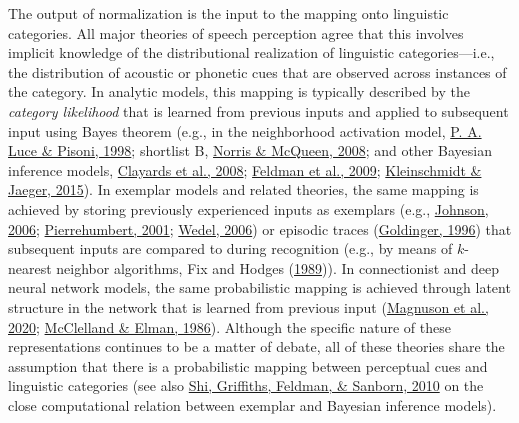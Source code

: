 \documentclass[
  11pt,
  man,floatsintext]{apa6}
\begin{document}
The output of normalization is the input to the mapping onto linguistic categories. All major theories of speech perception agree that this involves implicit knowledge of the distributional realization of linguistic categories---i.e., the distribution of acoustic or phonetic cues that are observed across instances of the category. In analytic models, this mapping is typically described by the \emph{category likelihood} that is learned from previous inputs and applied to subsequent input using Bayes theorem (e.g., in the neighborhood activation model, \protect\hyperlink{ref-luce-pisoni1998}{P. A. Luce \& Pisoni, 1998}; shortlist B, \protect\hyperlink{ref-norris-mcqueen2008}{Norris \& McQueen, 2008}; and other Bayesian inference models, \protect\hyperlink{ref-clayards2008}{Clayards et al., 2008}; \protect\hyperlink{ref-feldman2009}{Feldman et al., 2009}; \protect\hyperlink{ref-kleinschmidt-jaeger2015}{Kleinschmidt \& Jaeger, 2015}). In exemplar models and related theories, the same mapping is achieved by storing previously experienced inputs as exemplars (e.g., \protect\hyperlink{ref-johnson2006}{Johnson, 2006}; \protect\hyperlink{ref-pierrehumbert2001}{Pierrehumbert, 2001}; \protect\hyperlink{ref-wedel2006}{Wedel, 2006}) or episodic traces (\protect\hyperlink{ref-goldinger1996}{Goldinger, 1996}) that subsequent inputs are compared to during recognition (e.g., by means of \(k\)-nearest neighbor algorithms, Fix and Hodges (\protect\hyperlink{ref-fix-hodges1989}{1989})). In connectionist and deep neural network models, the same probabilistic mapping is achieved through latent structure in the network that is learned from previous input (\protect\hyperlink{ref-magnuson2020}{Magnuson et al., 2020}; \protect\hyperlink{ref-mcclelland-elman1986}{McClelland \& Elman, 1986}). Although the specific nature of these representations continues to be a matter of debate, all of these theories share the assumption that there is a probabilistic mapping between perceptual cues and linguistic categories (see also \protect\hyperlink{ref-shi2010}{Shi, Griffiths, Feldman, \& Sanborn, 2010} on the close computational relation between exemplar and Bayesian inference models).
\end{document}
